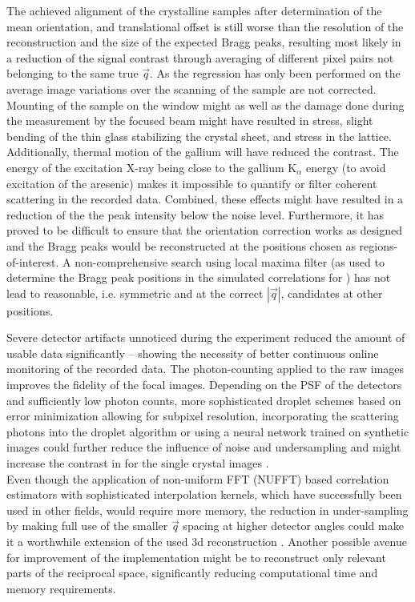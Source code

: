 The achieved alignment of the crystalline samples after determination of the mean orientation, and translational offset is still worse than the resolution of the reconstruction and the size of the expected Bragg peaks, resulting most likely in a reduction of the signal contrast through averaging of different pixel pairs not belonging to the same true $\vec{q}$. As the regression has only been performed on the average image variations over the scanning of the sample are not corrected. Mounting of the sample on the window might as well as the damage done during the measurement by the focused beam might have resulted in stress, slight bending of the thin glass stabilizing the crystal sheet, and stress in the lattice. Additionally, thermal motion of the gallium will have reduced the contrast. The energy of the excitation X-ray being close to the gallium K$_\alpha$ energy (to avoid excitation of the aresenic) makes it impossible to quantify or filter coherent scattering in the recorded data. Combined, these effects might have resulted in a reduction of the the peak intensity below the noise level. Furthermore, it has proved to be difficult to ensure that the orientation correction works as designed and the Bragg peaks would be reconstructed at the positions chosen as regions-of-interest. A non-comprehensive search using local maxima filter (as used to determine the Bragg peak positions in the simulated correlations for ) has not lead to reasonable, i.e. symmetric and at the correct $\left|\vec{q}\right|$, candidates at other positions.

Severe detector artifacts unnoticed during the experiment reduced the amount of usable data significantly -- showing the necessity of better continuous online monitoring of the recorded data. The photon-counting applied to the raw images improves the fidelity of the focal images. Depending on the PSF of the detectors and sufficiently low photon counts, more sophisticated droplet schemes based on error minimization allowing for subpixel resolution, incorporating the scattering photons into the droplet algorithm or using a neural network trained on synthetic images could further reduce the influence of noise and undersampling and might increase the contrast in for the single crystal images \cite{baumann2018,collaboration2014,schayck2020,sun2020}.\\
Even though the application of non-uniform FFT (NUFFT) based correlation estimators with sophisticated interpolation kernels, which have successfully been used in other fields, would require more memory, the reduction in under-sampling by making full use of the smaller $\vec{q}$ spacing at higher detector angles could make it a worthwhile extension of the used 3d reconstruction \cite{laguna1998,yang2008,chang2020}. Another possible avenue for improvement of the implementation might be to reconstruct only relevant parts of the reciprocal space, significantly reducing computational time and memory requirements. 

